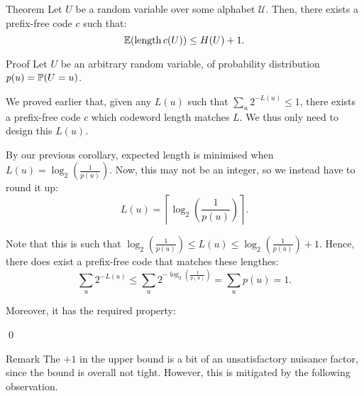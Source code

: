 \documentclass[a4paper]{article}
\begin{document}
\begin{parag}{Theorem}
    Let $U$ be a random variable over some alphabet $\mathcal{U}$. Then, there exists a prefix-free code $c$ such that: 
    \[\exval\left(\length c\left(U\right)\right) \leq H\left(U\right) + 1.\]

    \begin{subparag}{Proof}
        Let $U$ be an arbitrary random variable, of probability distribution $p\left(u\right) = \prob\left(U = u\right)$.

        We proved earlier that, given any $L\left(u\right)$ such that $\sum_{u} 2^{-L\left(u\right)} \leq 1$, there exists a prefix-free code $c$ which codeword length matches $L$. We thus only need to design this $L\left(u\right)$.

        By our previous corollary, expected length is minimised when $L\left(u\right) = \log_2\left(\frac{1}{p\left(u\right)}\right)$. Now, this may not be an integer, so we instead have to round it up: 
        \[L\left(u\right) = \left\lceil \log_2\left(\frac{1}{p\left(u\right)}\right) \right\rceil.\]
        
        Note that this is such that $\log_2\left(\frac{1}{p\left(u\right)}\right) \leq L\left(u\right) \leq \log_2\left(\frac{1}{p\left(u\right)}\right) + 1$. Hence, there does exist a prefix-free code that matches these lengthes: 
        \[\sum_{u} 2^{-L\left(u\right)} \leq \sum_{u} 2^{-\log_2\left(\frac{1}{p\left(u\right)}\right)} = \sum_{u} p\left(u\right) = 1.\]

        Moreover, it has the required property: 
        
        \qed
    \end{subparag}

    \begin{subparag}{Remark}
        The $+1$ in the upper bound is a bit of an unsatisfactory nuisance factor, since the bound is overall not tight. However, this is mitigated by the following observation.
    \end{subparag}
\end{parag}
\end{document}
